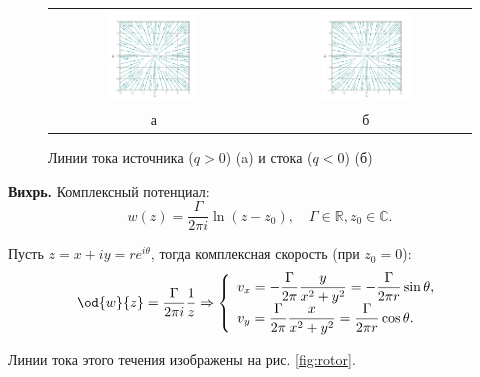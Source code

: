\documentclass[14pt]{extarticle}
\begin{document}
\begin{problems}
\begin{figure}
	\centering
	\begin{tabular}{cc}
	\includegraphics[width=0.45\textwidth]{../img/source.pdf} &
	\includegraphics[width=0.45\textwidth]{../img/sink.pdf} \\
	а & б 
	\end{tabular}
	\caption{Линии тока источника ($q>0$) (a) и стока ($q<0$) (б)}
	\label{fig:source_sink}
\end{figure}

\item
\textbf{Вихрь.} Комплексный потенциал:
\[
	w(z) = \frac{\Gamma}{2\pi i}\ln(z-z_0),\quad
	\Gamma \in\mathbb{R}, z_0\in\mathbb{C}.
\]
			
Пусть $z=x+iy=re^{i\theta}$, тогда комплексная скорость (при $z_0=0$):
\[
	\od{w}{z} = \frac{\Gamma}{2\pi i}\frac{1}{z} \Rightarrow 
	\left\{
	\begin{array}{l}
		\displaystyle	v_x = -\frac{\Gamma}{2\pi}\frac{y}{x^2+y^2} = -\frac{\Gamma}{2\pi r}\sin\theta,\\
		\displaystyle	v_y = \frac{\Gamma}{2\pi}\frac{x}{x^2+y^2} = \frac{\Gamma}{2\pi r}\cos\theta.
	\end{array}
	\right.
\]

Линии тока этого течения изображены на рис. \ref{fig:rotor}.


\end{problems}
\end{document}
